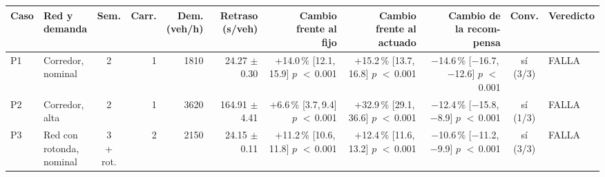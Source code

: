 \begin{table}[H]
\centering
\scriptsize
\setlength{\tabcolsep}{1.5pt}
\begin{tabular}{llcrrrrrrcl}
\toprule
Caso & \makecell[l]{Red y\\demanda} & Sem. & Carr. & \makecell{Dem.\\(veh/h)} & \makecell{Retraso\\(s/veh)} & \makecell{Cambio\\frente al\\fijo} & \makecell{Cambio\\frente al\\actuado} & \makecell{Cambio de\\la recom-\\pensa} & Conv. & Veredicto \\
\midrule
P1 & \makecell[l]{Corredor,\\{}nominal} & 2 & 1 & 1810 & \makecell[r]{24.27\\{}$\pm$ 0.30} & \makecell[r]{+14.0\,\%\\{}[12.1,\,15.9]\\$p$ $<$\,0.001} & \makecell[r]{+15.2\,\%\\{}[13.7,\,16.8]\\$p$ $<$\,0.001} & \makecell[r]{$-$14.6\,\%\\{}[$-$16.7,\,$-$12.6]\\$p$ $<$\,0.001} & \makecell[c]{sí\\{}(3/3)} & FALLA \\
P2 & \makecell[l]{Corredor,\\{}alta} & 2 & 1 & 3620 & \makecell[r]{164.91\\{}$\pm$ 4.41} & \makecell[r]{+6.6\,\%\\{}[3.7,\,9.4]\\$p$ $<$\,0.001} & \makecell[r]{+32.9\,\%\\{}[29.1,\,36.6]\\$p$ $<$\,0.001} & \makecell[r]{$-$12.4\,\%\\{}[$-$15.8,\,$-$8.9]\\$p$ $<$\,0.001} & \makecell[c]{sí\\{}(1/3)} & FALLA \\
P3 & \makecell[l]{Red con\\{}rotonda,\\{}nominal} & \makecell[c]{3\\{}+ rot.} & 2 & 2150 & \makecell[r]{24.15\\{}$\pm$ 0.11} & \makecell[r]{+11.2\,\%\\{}[10.6,\,11.8]\\$p$ $<$\,0.001} & \makecell[r]{+12.4\,\%\\{}[11.6,\,13.2]\\$p$ $<$\,0.001} & \makecell[r]{$-$10.6\,\%\\{}[$-$11.2,\,$-$9.9]\\$p$ $<$\,0.001} & \makecell[c]{sí\\{}(3/3)} & FALLA \\

\end{tabular}
\end{table}
